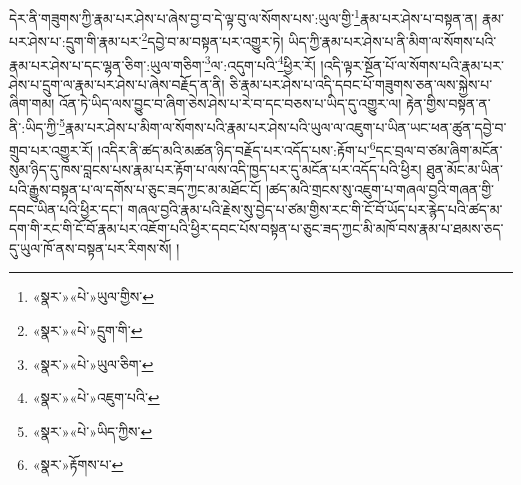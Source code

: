 དེར་ནི་གཟུགས་ཀྱི་རྣམ་པར་ཤེས་པ་ཞེས་བྱ་བ་དེ་ལྟ་བུ་ལ་སོགས་པས་:ཡུལ་གྱི་\footnote{«སྣར་»«པེ་»ཡུལ་གྱིས་}རྣམ་པར་ཤེས་པ་བསྟན་ན། རྣམ་པར་ཤེས་པ་:དྲུག་གི་རྣམ་པར་\footnote{«སྣར་»«པེ་»དྲུག་གི་}དབྱེ་བ་མ་བསྟན་པར་འགྱུར་ཏེ། ཡིད་ཀྱི་རྣམ་པར་ཤེས་པ་ནི་མིག་ལ་སོགས་པའི་རྣམ་པར་ཤེས་པ་དང་ལྷན་ཅིག་:ཡུལ་གཅིག་\footnote{«སྣར་»«པེ་»ཡུལ་ཅིག་}ལ་:འདུག་པའི་\footnote{«སྣར་»«པེ་»འཇུག་པའི་}ཕྱིར་རོ། །འདི་ལྟར་སྔོན་པོ་ལ་སོགས་པའི་རྣམ་པར་ཤེས་པ་དྲུག་ལ་རྣམ་པར་ཤེས་པ་ཞེས་བརྗོད་ན་ནི། ཅི་རྣམ་པར་ཤེས་པ་འདི་དབང་པོ་གཟུགས་ཅན་ལས་སྐྱེས་པ་ཞིག་གམ། འོན་ཏེ་ཡིད་ལས་བྱུང་བ་ཞིག་ཅེས་ཤེས་པ་རེ་བ་དང་བཅས་པ་ཡིད་དུ་འགྱུར་ལ། རྟེན་གྱིས་བསྟན་ན་ནི་:ཡིད་ཀྱི་\footnote{«སྣར་»«པེ་»ཡིད་ཀྱིས་}རྣམ་པར་ཤེས་པ་མིག་ལ་སོགས་པའི་རྣམ་པར་ཤེས་པའི་ཡུལ་ལ་འཇུག་པ་ཡིན་ཡང་ཕན་ཚུན་དབྱེ་བ་གྲུབ་པར་འགྱུར་རོ། །འདིར་ནི་ཚད་མའི་མཚན་ཉིད་བརྗོད་པར་འདོད་པས་:རྟོག་པ་\footnote{«སྣར་»རྟོགས་པ་}དང་བྲལ་བ་ཙམ་ཞིག་མངོན་སུམ་ཉིད་དུ་ཁས་བླངས་པས་རྣམ་པར་རྟོག་པ་ལས་འདི་ཁྱད་པར་དུ་མངོན་པར་འདོད་པའི་ཕྱིར། ཐུན་མོང་མ་ཡིན་པའི་རྒྱུས་བསྟན་པ་ལ་དགོས་པ་ཅུང་ཟད་ཀྱང་མ་མཐོང་ངོ། །ཚད་མའི་གྲངས་སུ་འཇུག་པ་གཞལ་བྱའི་གཞན་གྱི་དབང་ཡིན་པའི་ཕྱིར་དང་། གཞལ་བྱའི་རྣམ་པའི་རྗེས་སུ་བྱེད་པ་ཙམ་གྱིས་རང་གི་ངོ་བོ་ཡོད་པར་རྙེད་པའི་ཚད་མ་དག་གི་རང་གི་ངོ་བོ་རྣམ་པར་འཇོག་པའི་ཕྱིར་དབང་པོས་བསྟན་པ་ཅུང་ཟད་ཀྱང་མི་མཁོ་བས་རྣམ་པ་ཐམས་ཅད་དུ་ཡུལ་ཁོ་ནས་བསྟན་པར་རིགས་སོ། །
